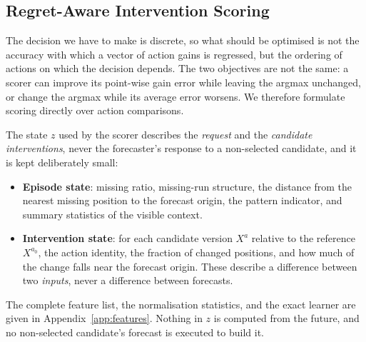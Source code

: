 \documentclass{article}
\begin{document}
\subsection{Regret-Aware Intervention Scoring}
\label{sec:method-scoring}
The decision we have to make is discrete, so what should be optimised is not the accuracy
with which a vector of action gains is regressed, but the ordering of actions on which the
decision depends. The two objectives are not the same: a scorer can improve its point-wise
gain error while leaving the argmax unchanged, or change the argmax while its average error
worsens. We therefore formulate scoring directly over action comparisons.

The state $z$ used by the scorer describes the \emph{request} and the \emph{candidate
interventions}, never the forecaster's response to a non-selected candidate, and it is kept
deliberately small:
\begin{itemize}\itemsep1pt
  \item \textbf{Episode state}: missing ratio, missing-run structure, the distance from the
  nearest missing position to the forecast origin, the pattern indicator, and summary
  statistics of the visible context.
  \item \textbf{Intervention state}: for each candidate version $X^{a}$ relative to the
  reference $X^{a_0}$, the action identity, the fraction of changed positions, and how much
  of the change falls near the forecast origin. These describe a difference between two
  \emph{inputs}, never a difference between forecasts.
\end{itemize}
The complete feature list, the normalisation statistics, and the exact learner are given in
Appendix~\ref{app:features}. Nothing in $z$ is computed from the future, and no
non-selected candidate's forecast is executed to build it.
\end{document}
